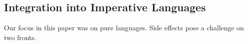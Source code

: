 


\subsection{Integration into Imperative Languages}
\label{sec:imperative-langs}
Our focus in this paper was on pure languages.
Side effects pose a challenge on two fronts.

